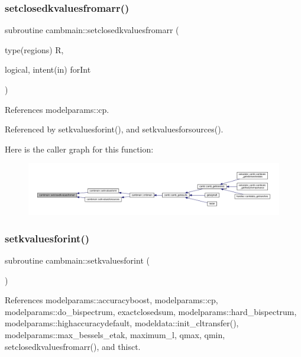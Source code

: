 \subsubsection{\texorpdfstring{setclosedkvaluesfromarr()}{setclosedkvaluesfromarr()}}
{\footnotesize\ttfamily subroutine cambmain\+::setclosedkvaluesfromarr (\begin{DoxyParamCaption}\item[{type(regions)}]{R,  }\item[{logical, intent(in)}]{for\+Int }\end{DoxyParamCaption})\hspace{0.3cm}{\ttfamily [private]}}



References modelparams\+::cp.



Referenced by setkvaluesforint(), and setkvaluesforsources().

Here is the caller graph for this function\+:
\nopagebreak
\begin{figure}[H]
\begin{center}
\leavevmode
\includegraphics[width=350pt]{namespacecambmain_a96c41c9fdee3e69fba450a460df25472_icgraph}
\end{center}
\end{figure}
\mbox{\label{namespacecambmain_ad0f2dd9e839652502a6e34c32ec44e0d}} 
\subsubsection{\texorpdfstring{setkvaluesforint()}{setkvaluesforint()}}
{\footnotesize\ttfamily subroutine cambmain\+::setkvaluesforint (\begin{DoxyParamCaption}{ }\end{DoxyParamCaption})\hspace{0.3cm}{\ttfamily [private]}}



References modelparams\+::accuracyboost, modelparams\+::cp, modelparams\+::do\+\_\+bispectrum, exactclosedsum, modelparams\+::hard\+\_\+bispectrum, modelparams\+::highaccuracydefault, modeldata\+::init\+\_\+cltransfer(), modelparams\+::max\+\_\+bessels\+\_\+etak, maximum\+\_\+l, qmax, qmin, setclosedkvaluesfromarr(), and thisct.



